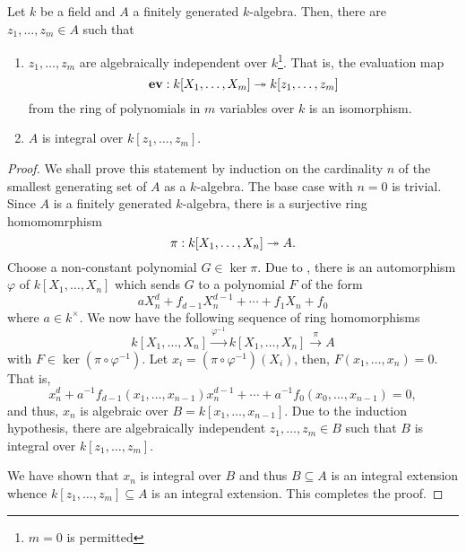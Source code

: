 \begin{theorem}
    Let $k$ be a field and $A$ a finitely generated $k$-algebra. Then, there are $z_1,\dots,z_m\in A$ such that 
    \begin{enumerate}[label=(\alph*)]
        \item $z_1,\dots,z_m$ are algebraically independent over $k$\footnote{$m = 0$ is permitted}. That is, the evaluation map 
        \begin{equation*}
            \mathbf{ev}: k[X_1,\dots,X_m]\twoheadrightarrow k[z_1,\dots,z_m]
        \end{equation*}
        from the ring of polynomials in $m$ variables over $k$ is an isomorphism. 
        \item $A$ is integral over $k[z_1,\dots,z_m]$.
    \end{enumerate}
\end{theorem}
\begin{proof}
    We shall prove this statement by induction on the cardinality $n$ of the smallest generating set of $A$ as a $k$-algebra. The base case with $n = 0$ is trivial. Since $A$ is a finitely generated $k$-algebra, there is a surjective ring homomomrphism 
    \begin{equation*}
        \pi: k[X_1,\dots,X_n]\twoheadrightarrow A.
    \end{equation*}
    Choose a non-constant polynomial $G\in\ker\pi$. Due to , there is an automorphism $\varphi$ of $k[X_1,\dots,X_n]$ which sends $G$ to a polynomial $F$ of the form 
    \begin{equation*}
        aX_n^d + f_{d - 1}X_n^{d - 1} + \cdots + f_1X_n + f_0
    \end{equation*}
    where $a\in k^\times$. We now have the following sequence of ring homomorphisms
    \begin{equation*}
        k[X_1,\dots,X_n]\stackrel{\varphi^{-1}}{\longrightarrow}k[X_1,\dots,X_n]\stackrel{\pi}{\longrightarrow} A
    \end{equation*}
    with $F\in\ker(\pi\circ\varphi^{-1})$. Let $x_i = (\pi\circ\varphi^{-1})(X_i)$, then, $F(x_1,\dots,x_n) = 0$. That is, 
    \begin{equation*}
        x_n^d + a^{-1}f_{d - 1}(x_1,\dots,x_{n - 1})x_n^{d - 1} + \cdots + a^{-1}f_0(x_0,\dots,x_{n - 1}) = 0,
    \end{equation*}
    and thus, $x_n$ is algebraic over $B = k[x_1,\dots,x_{n - 1}]$. Due to the induction hypothesis, there are algebraically independent $z_1,\dots,z_m\in B$ such that $B$ is integral over $k[z_1,\dots,z_m]$. 

    We have shown that $x_n$ is integral over $B$ and thus $B\subseteq A$ is an integral extension whence $k[z_1,\dots,z_m]\subseteq A$ is an integral extension. This completes the proof.
\end{proof}

